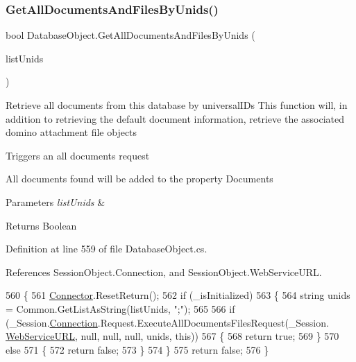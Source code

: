 \subsubsection{\texorpdfstring{Get\+All\+Documents\+And\+Files\+By\+Unids()}{GetAllDocumentsAndFilesByUnids()}\hspace{0.1cm}{\footnotesize\ttfamily [2/2]}}
{\footnotesize\ttfamily bool Database\+Object.\+Get\+All\+Documents\+And\+Files\+By\+Unids (\begin{DoxyParamCaption}\item[{I\+List}]{list\+Unids }\end{DoxyParamCaption})}



Retrieve all documents from this database by universal\+I\+Ds This function will, in addition to retrieving the default document information, retrieve the associated domino attachment file objects 

Triggers an all documents request

All documents found will be added to the property \textquotesingle{}Documents\textquotesingle{}


\begin{DoxyParams}{Parameters}
{\em list\+Unids} & \\
\hline
\end{DoxyParams}
\begin{DoxyReturn}{Returns}
Boolean
\end{DoxyReturn}


Definition at line 559 of file Database\+Object.\+cs.



References Session\+Object.\+Connection, and Session\+Object.\+Web\+Service\+U\+RL.


\begin{DoxyCode}
560     \{
561         \mbox{\hyperlink{class_connector}{Connector}}.ResetReturn();
562         \textcolor{keywordflow}{if} (\_isInitialized)
563         \{
564             \textcolor{keywordtype}{string} unids = Common.GetListAsString(listUnids, \textcolor{stringliteral}{";"});
565 
566             \textcolor{keywordflow}{if} (\_Session.\mbox{\hyperlink{class_session_object_a014bdbf705a753540e19bfb53030c55c}{Connection}}.Request.ExecuteAllDocumentsFilesRequest(\_Session.
      \mbox{\hyperlink{class_session_object_a697c071c812fbf7ad1166b896fb44c16}{WebServiceURL}}, null, null, null, unids, \textcolor{keyword}{this}))
567             \{
568                 \textcolor{keywordflow}{return} \textcolor{keyword}{true};
569             \}
570             \textcolor{keywordflow}{else}
571             \{
572                 \textcolor{keywordflow}{return} \textcolor{keyword}{false};
573             \}
574         \}
575         \textcolor{keywordflow}{return} \textcolor{keyword}{false};
576     \}
\end{DoxyCode}
\mbox{\label{class_database_object_a6bfb480373a7e2bdbeaa67e4e3303a3a}} 
